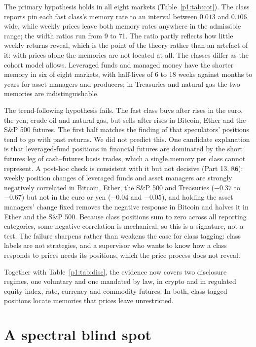 The primary hypothesis holds in all eight markets (Table~\ref{p1:tab:cot}). The class reports pin each fast class's memory rate to an interval between $0.013$ and $0.106$ wide, while weekly prices leave both memory rates anywhere in the admissible range; the width ratios run from 9 to 71. The ratio partly reflects how little weekly returns reveal, which is the point of the theory rather than an artefact of it: with prices alone the memories are not located at all. The classes differ as the cohort model allows. Leveraged funds and managed money have the shorter memory in six of eight markets, with half-lives of 6 to 18 weeks against months to years for asset managers and producers; in Treasuries and natural gas the two memories are indistinguishable.

The trend-following hypothesis fails. The fast class buys after rises in the euro, the yen, crude oil and natural gas, but sells after rises in Bitcoin, Ether and the S\&P 500 futures. The first half matches the finding of \citet{p1:moskowitz2012} that speculators' positions tend to go with past returns. We did not predict this. One candidate explanation is that leveraged-fund positions in financial futures are dominated by the short futures leg of cash--futures basis trades, which a single memory per class cannot represent. A post-hoc check is consistent with it but not decisive (Part 13, \texttt{R6}): weekly position changes of leveraged funds and asset managers are strongly negatively correlated in Bitcoin, Ether, the S\&P 500 and Treasuries ($-0.37$ to $-0.67$) but not in the euro or yen ($-0.04$ and $-0.05$), and holding the asset managers' change fixed removes the negative response in Bitcoin and halves it in Ether and the S\&P 500. Because class positions sum to zero across all reporting categories, some negative correlation is mechanical, so this is a signature, not a test. The failure sharpens rather than weakens the case for class tagging: class labels are not strategies, and a supervisor who wants to know how a class responds to prices needs its positions, which the price process does not reveal.

Together with Table~\ref{p1:tab:disc}, the evidence now covers two disclosure regimes, one voluntary and one mandated by law, in crypto and in regulated equity-index, rate, currency and commodity futures. In both, class-tagged positions locate memories that prices leave unrestricted.

\section{A spectral blind spot}\label{p1:sec:blind}

